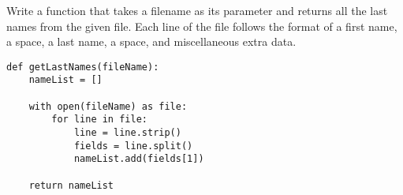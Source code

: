 Write a function that takes a filename as its parameter and returns all the last names from the given file. Each line of the file follows the format of a first name, a space, a last name, a space, and miscellaneous extra data. 

\begin{answer}
\begin{lstlisting}
def getLastNames(fileName):
    nameList = []

    with open(fileName) as file:
        for line in file:
            line = line.strip()
            fields = line.split()
            nameList.add(fields[1])

    return nameList
\end{lstlisting}
\end{answer}
